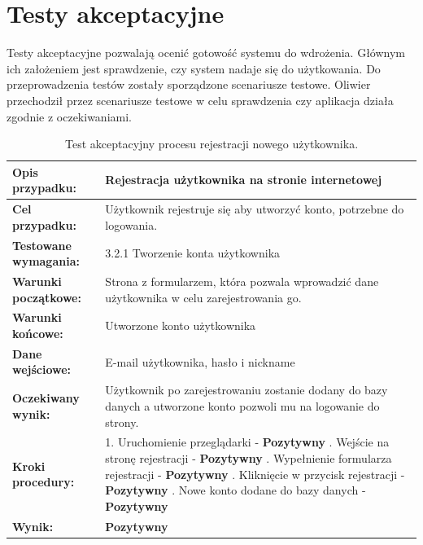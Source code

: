 \section{Testy akceptacyjne}

Testy akceptacyjne pozwalają ocenić gotowość systemu do wdrożenia. Głównym ich założeniem jest sprawdzenie, czy system nadaje się do użytkowania.\cite{acceptanceTesting} Do przeprowadzenia testów zostały sporządzone scenariusze testowe. Oliwier przechodził przez scenariusze testowe w celu sprawdzenia czy aplikacja działa zgodnie z oczekiwaniami.


\begin{table}[H]
\centering
\begin{tabularx}{\textwidth}{|>{\raggedright\arraybackslash}p{}|X|}
    \hline
    \textbf{Opis przypadku:} & Rejestracja użytkownika na stronie internetowej \\
    \hline
    \textbf{Cel przypadku:} & Użytkownik rejestruje się aby utworzyć konto, potrzebne do logowania. \\
    \hline
    \textbf{Testowane wymagania:} & 3.2.1 Tworzenie konta użytkownika \\
    \hline
    \textbf{Warunki początkowe:} & Strona z formularzem, która pozwala wprowadzić dane użytkownika w celu zarejestrowania go. \\
    \hline
    \textbf{Warunki końcowe:} & Utworzone konto użytkownika \\
    \hline
    \textbf{Dane wejściowe:} & E-mail użytkownika, hasło i nickname \\
    \hline
    \textbf{Oczekiwany wynik:} & Użytkownik po zarejestrowaniu zostanie dodany do bazy danych a utworzone konto pozwoli mu na logowanie do strony. \\
    \hline
    \textbf{Kroki procedury:} &
        1. Uruchomienie przeglądarki - \textbf{Pozytywny} \newline
        2. Wejście na stronę rejestracji - \textbf{Pozytywny} \newline
        3. Wypełnienie formularza rejestracji - \textbf{Pozytywny} \newline
        4. Kliknięcie w przycisk rejestracji - \textbf{Pozytywny} \newline
        5. Nowe konto dodane do bazy danych - \textbf{Pozytywny} \\
    \hline
    \textbf{Wynik:} & \textbf{Pozytywny} \\
    \hline
\end{tabularx}
    \caption{Test akceptacyjny procesu rejestracji nowego użytkownika.}
\end{table}


